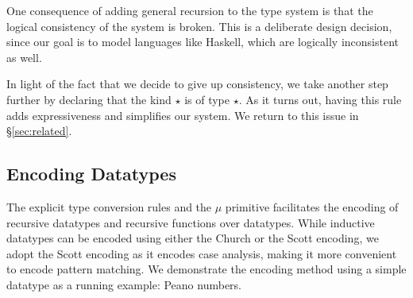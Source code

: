   

One consequence of adding general recursion to the type system is that
the logical consistency of the system is broken. This is a deliberate
design decision, since our goal is to model languages like Haskell,
which are logically inconsistent as well.

In light of the fact that we decide to give up consistency, we take
another step further by declaring that the kind $\star$ is of type
$\star$. As it turns out, having this rule adds expressiveness and
simplifies our system. We return to this issue in \S\ref{sec:related}.


\subsection{Encoding Datatypes}

The explicit type conversion rules and the $\mu$ primitive facilitates
the encoding of recursive datatypes and recursive functions over
datatypes. While inductive datatypes can be encoded using either the
Church or the Scott encoding, we adopt the Scott encoding as it
encodes case analysis, making it more convenient to encode pattern
matching. We demonstrate the encoding method using a simple datatype
as a running example: Peano numbers.

